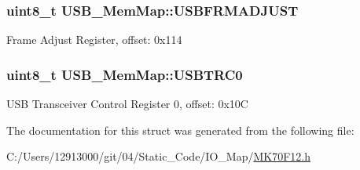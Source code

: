 \subsubsection[{U\+S\+B\+F\+R\+M\+A\+D\+J\+U\+S\+T}]{\setlength{\rightskip}{0pt plus 5cm}uint8\+\_\+t U\+S\+B\+\_\+\+Mem\+Map\+::\+U\+S\+B\+F\+R\+M\+A\+D\+J\+U\+S\+T}\label{struct_u_s_b___mem_map_a1bb1b3975dfcbbe78635e2d08b16553d}
Frame Adjust Register, offset\+: 0x114 \hypertarget{struct_u_s_b___mem_map_a10d494a848ee49ff264d62eb0bfb439e}{}
\subsubsection[{U\+S\+B\+T\+R\+C0}]{\setlength{\rightskip}{0pt plus 5cm}uint8\+\_\+t U\+S\+B\+\_\+\+Mem\+Map\+::\+U\+S\+B\+T\+R\+C0}\label{struct_u_s_b___mem_map_a10d494a848ee49ff264d62eb0bfb439e}
U\+S\+B Transceiver Control Register 0, offset\+: 0x10\+C 

The documentation for this struct was generated from the following file\+:\begin{DoxyCompactItemize}
\item 
C\+:/\+Users/12913000/git/04/\+Static\+\_\+\+Code/\+I\+O\+\_\+\+Map/\hyperlink{_m_k70_f12_8h}{M\+K70\+F12.\+h}\end{DoxyCompactItemize}
